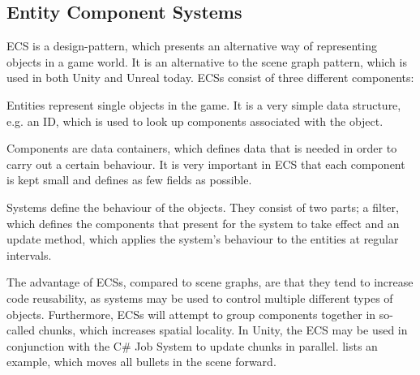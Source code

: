 \subsection{Entity Component Systems}
\gls{ECS} is a design-pattern, which presents an alternative way of representing objects in a game world. It is an alternative to the scene graph pattern\cite{scene:graph}, which is used in both Unity and Unreal today. \glspl{ECS} consist of three different components\cite{unity:ecs,ecs:general}:
\begin{labeling}{\quad\quad}
    \item[Entities] represent single objects in the game. It is a very simple data structure, e.g. an ID, which is used to look up components associated with the object.
    \item[Components] are data containers, which defines data that is needed in order to carry out a certain behaviour. It is very important in \gls{ECS} that each component is kept small and defines as few fields as possible.
    \item[Systems] define the behaviour of the objects. They consist of two parts; a filter, which defines the components that present for the system to take effect and an update method, which applies the system's behaviour to the entities at regular intervals.
\end{labeling}

The advantage of \glspl{ECS}, compared to scene graphs, are that they tend to increase code reusability, as systems may be used to control multiple different types of objects. Furthermore, \glspl{ECS} will attempt to group components together in so-called chunks, which increases spatial locality. In Unity, the \gls{ECS} may be used in conjunction with the C\# Job System to update chunks in parallel\cite{unity:ecs}.  lists an example, which moves all bullets in the scene forward.


